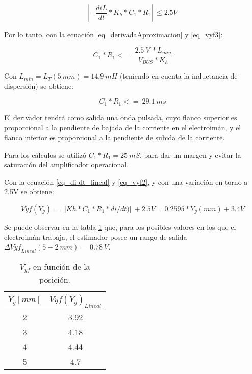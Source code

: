 \begin{equation} \label{eq_vyf3}
	\left|-\frac{diL}{dt}*K_h*C_1*R_1\right|\ \le 2.5V
\end{equation}

\noindent Por lo tanto, con la ecuaci\'{o}n \ref{eq_derivadaAproximacion} y \ref{eq_vyf3}:

\begin{equation} \label{eq_condicionC1-R1}
	C_1*R_1<=\frac{2.5\ V\ *L_{min}}{V_{BUS}*K_h}
\end{equation}

\noindent Con $L_{min}= L_T(5\: mm)= 14.9\: mH$ (teniendo en cuenta la inductancia de dispersi\'{o}n) se obtiene: 

\begin{equation} \label{eq_condicionC1-R1-2}
	C_1*R_1<=\ 29.1\ ms
\end{equation}

\noindent El derivador tendr\'{a} como salida una onda pulsada, cuyo flanco superior  es proporcional a la pendiente de bajada de la corriente en el electroim\'{a}n, y el flanco inferior es proporcional a la pendiente de subida de la corriente. 

\noindent Para los c\'{a}lculos se utiliz\'{o} $C_1*R_1= 25\: mS$, para dar un margen y evitar la saturaci\'{o}n del amplificador operacional.  

\noindent Con la ecuaci\'{o}n \ref{eq_di-dt_lineal} y \ref{eq_vyf2}, y con una variaci\'{o}n en torno a 2.5V se obtiene:


\begin{equation} \label{eq_Vyf-lineal}
	Vyf(Y_g)\ =\ |Kh*C_1*R_1*di/dt)|\ +2.5V=0.2595*Y_g(mm)+3.4V
\end{equation}

\noindent Se puede observar en la tabla \ref{tab_Vyf_vs_y} que, para los posibles valores en los que el electroim\'{a}n trabaja, el estimador posee un rango de salida ${\mathit{\Delta}{Vyf}_{Lineal}}(5-2\ mm)=\ 0.78\ V$.

\begin{table}[H]
	\begin{center}
		\begin{tabular}{| c | c |}
			\hline
			$Y_g[mm]$ & ${Vyf(Y_g)}_{Lineal}$\\ \hline
			2 & 3.92 \\ \hline 
			3 & 4.18 \\ \hline 
			4 & 4.44 \\ \hline 
			5 & 4.7 \\ \hline 
		\end{tabular}
		\caption{$V_{yf}$ en función de la posición.}
		\label{tab_Vyf_vs_y}
	\end{center}
\end{table}

